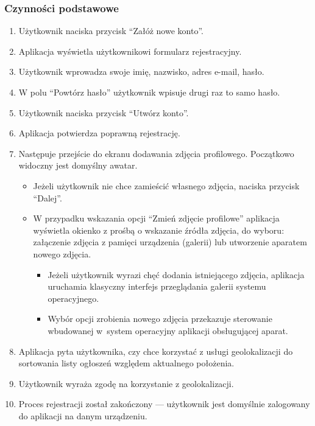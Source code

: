 \documentclass[licencjacka]{pracamgr}
\begin{document}
    \subsubsection{Czynności podstawowe}
    \begin{enumerate}
        \item Użytkownik naciska przycisk ``Załóż nowe konto''.
        \item Aplikacja wyświetla użytkownikowi formularz rejestracyjny.
        \item Użytkownik wprowadza swoje imię, nazwisko, adres e-mail, hasło.
        \item W polu ``Powtórz hasło'' użytkownik wpisuje drugi raz to samo hasło.
        \item Użytkownik naciska przycisk ``Utwórz konto''.
        \item Aplikacja potwierdza poprawną rejestrację.
        \item Następuje przejście do ekranu dodawania zdjęcia profilowego. Początkowo widoczny jest domyślny awatar.
            \begin{itemize}
                \item Jeżeli użytkownik nie chce zamieścić własnego zdjęcia, naciska przycisk ``Dalej''.
                \item W przypadku wskazania opcji ``Zmień zdjęcie profilowe'' aplikacja wyświetla okienko z prośbą o wskazanie źródła zdjęcia, do wyboru: załączenie zdjęcia z pamięci urządzenia (galerii) lub utworzenie aparatem nowego zdjęcia.
                    \begin{itemize}
                        \item Jeżeli użytkownik wyrazi chęć dodania istniejącego zdjęcia, aplikacja uruchamia klasyczny interfejs przeglądania galerii systemu operacyjnego.
                        \item Wybór opcji zrobienia nowego zdjęcia przekazuje sterowanie wbudowanej w~system operacyjny aplikacji obsługującej aparat.
                    \end{itemize}
            \end{itemize}
     \item Aplikacja pyta użytkownika, czy chce korzystać z usługi geolokalizacji do sortowania listy ogłoszeń względem aktualnego położenia.
     \item Użytkownik wyraża zgodę na korzystanie z geolokalizacji.
     \item Proces rejestracji został zakończony --- użytkownik jest domyślnie zalogowany do aplikacji na danym urządzeniu.
    \end{enumerate}
\end{document}
